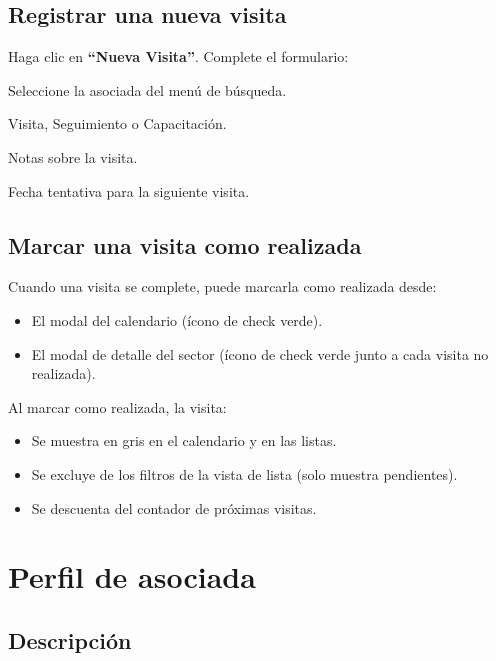 \documentclass[12pt]{article}
\begin{document}
\subsection{Registrar una nueva visita}
Haga clic en \textbf{``Nueva Visita''}. Complete el formulario:
\begin{description}[nosep]
  \item[Asociada (requerido)] Seleccione la asociada del menú de búsqueda.
  \item[Tipo] Visita, Seguimiento o Capacitación.
  \item[Observaciones] Notas sobre la visita.
  \item[Programar próxima visita (opcional)] Fecha tentativa para la siguiente visita.
\end{description}

\subsection{Marcar una visita como realizada}
Cuando una visita se complete, puede marcarla como realizada desde:
\begin{itemize}[nosep]
  \item El modal del calendario (ícono de check verde).
  \item El modal de detalle del sector (ícono de check verde junto a cada visita no realizada).
\end{itemize}

Al marcar como realizada, la visita:
\begin{itemize}[nosep]
  \item Se muestra en gris en el calendario y en las listas.
  \item Se excluye de los filtros de la vista de lista (solo muestra pendientes).
  \item Se descuenta del contador de próximas visitas.
\end{itemize}

\section{Perfil de asociada}
\label{sec:perfil}

\subsection{Descripción}
\label{subsec:perfil-descripcion}
\end{document}
